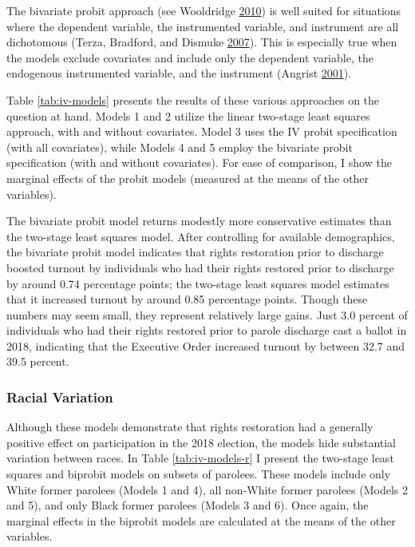 \documentclass[]{article}
\begin{document}
The bivariate probit approach (see Wooldridge \protect\hyperlink{ref-Wooldridge2010}{2010}) is well suited for situations where the dependent variable, the instrumented variable, and instrument are all dichotomous (Terza, Bradford, and Dismuke \protect\hyperlink{ref-Terza2007}{2007}). This is especially true when the models exclude covariates and include only the dependent variable, the endogenous instrumented variable, and the instrument (Angrist \protect\hyperlink{ref-Angrist2001}{2001}).

Table \ref{tab:iv-models} presents the results of these various approaches on the question at hand. Models 1 and 2 utilize the linear two-stage least squares approach, with and without covariates. Model 3 uses the IV probit specification (with all covariates), while Models 4 and 5 employ the bivariate probit specification (with and without covariates). For ease of comparison, I show the marginal effects of the probit models (measured at the means of the other variables).



The bivariate probit model returns modestly more conservative estimates than the two-stage least squares model. After controlling for available demographics, the bivariate probit model indicates that rights restoration prior to discharge boosted turnout by individuals who had their rights restored prior to discharge by around 0.74 percentage points; the two-stage least squares model estimates that it increased turnout by around 0.85 percentage points. Though these numbers may seem small, they represent relatively large gains. Just 3.0 percent of individuals who had their rights restored prior to parole discharge cast a ballot in 2018, indicating that the Executive Order increased turnout by between 32.7 and 39.5 percent.

\hypertarget{racial-variation}{%
\subsubsection*{Racial Variation}\label{racial-variation}}

Although these models demonstrate that rights restoration had a generally positive effect on participation in the 2018 election, the models hide substantial variation between races. In Table \ref{tab:iv-models-r} I present the two-stage least squares and biprobit models on subsets of parolees. These models include only White former parolees (Models 1 and 4), all non-White former parolees (Models 2 and 5), and only Black former parolees (Models 3 and 6). Once again, the marginal effects in the biprobit models are calculated at the means of the other variables.
\end{document}
